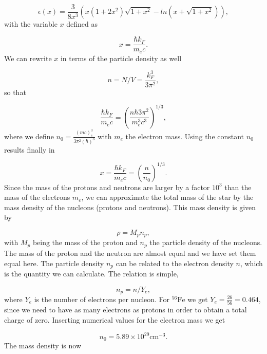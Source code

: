 \documentclass[%
oneside,                 %
final,                   %
10pt]{article}
\begin{document}
\begin{equation*}
\epsilon (x) =
\frac{3}{8x^3}\left( x(1+2x^2)\sqrt{1+x^2}-ln(x+\sqrt{1+x^2})\right),
\end{equation*}
with the variable $x$ defined as

\begin{equation*}
x=\frac{\hbar k_F}{m_ec}.
\end{equation*}
We can rewrite $x$ in terms of the particle density as well

\begin{equation*}
n=N/V=\frac{k_{F}^{3}}{3\pi^{2}},
\end{equation*}
so that

\begin{equation*}
\frac{\hbar k_F}{m_ec}=\left(\frac{n\hbar 3\pi^2}{m_e^3c^3}\right)^{1/3},
\end{equation*}
where we define
$n_{0}=\frac{(mc)^{3}_{e}}{3\pi^2(\hbar)^{3}}$ with $m_{e}$ the electron mass.
Using the constant $n_0$ results finally in

\begin{equation*}
x=\frac{\hbar k_F}{m_ec}=\left(\frac{n}{n_{0}}\right)^{1/3}.
\end{equation*}
Since the mass of the protons and neutrons are larger by a factor $10^3$ than the mass
of the electrons $m_e$, 
we can approximate the total mass of the star by the mass density of the nucleons (protons and neutrons).
This mass density is given by

\begin{equation*}
\rho = M_p n_p,
\end{equation*}
with $M_{p}$ being the  mass of the proton and $n_p$ the particle density of the nucleons.
The mass of the proton and the neutron are almost equal and we have set them equal here.
The particle density  $n_p$ can be related to the electron density $n$, which is the quantity
we can calculate. The relation is simple,

\begin{equation*}
n_p = n/Y_e ,
\end{equation*}
where $Y_{e}$ is the number of electrons per nucleon.  For $^{56}\mbox{Fe}$  we get $Y_{e}=\frac{26}{56}=0.464$, since we 
need to have as many electrons as protons in order to obtain a total charge of zero. Inserting numerical values
for the electron mass we get

\begin{equation*}
n_{0}=5.89\times 10^{29} \mathrm{cm}^{-3}.
\end{equation*}
The mass density is now
\end{document}

